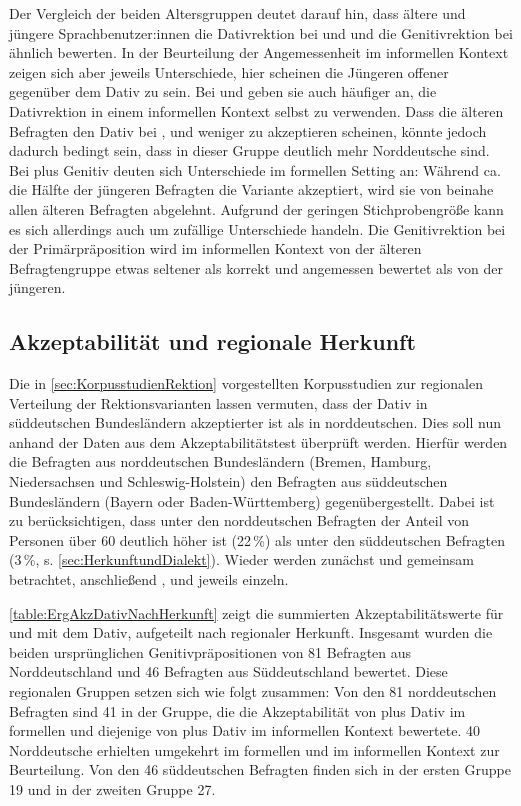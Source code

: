 Der Vergleich der beiden Altersgruppen deutet darauf hin, dass ältere und jüngere Sprachbenutzer:innen die Dativrektion bei \wegen{} und \waehrend{} und die Genitivrektion bei \dank{} ähnlich bewerten. 
In der Beurteilung der Angemessenheit im informellen Kontext zeigen sich aber jeweils Unterschiede, hier scheinen die Jüngeren offener gegenüber dem Dativ zu sein. 
Bei \wegen{} und \waehrend{} geben sie auch häufiger an, die Dativrektion in einem informellen Kontext selbst zu verwenden. 
Dass die älteren Befragten den Dativ bei \wegen{}, \waehrend{} und \dank{} weniger zu akzeptieren scheinen, könnte jedoch dadurch bedingt sein, dass in dieser Gruppe deutlich mehr Norddeutsche sind. 
Bei \gegenueber{} plus Genitiv deuten sich Unterschiede im formellen Setting an:
Während ca. die Hälfte der jüngeren Befragten die Variante akzeptiert, wird sie von beinahe allen älteren Befragten abgelehnt. 
Aufgrund der geringen Stichprobengröße kann es sich allerdings auch um zufällige Unterschiede handeln. 
Die Genitivrektion bei der Primärpräposition  wird im informellen Kontext von der älteren Befragtengruppe etwas seltener als korrekt und angemessen bewertet als von der jüngeren. 

\subsection{Akzeptabilität und regionale Herkunft}
\label{sec:ErgAkzNachRegion}
\begin{sloppypar}
Die in \autoref{sec:KorpusstudienRektion} vorgestellten Korpusstudien zur regionalen Verteilung der Rektionsvarianten lassen vermuten, dass der Dativ in süddeutschen Bundesländern akzeptierter ist als in norddeutschen. 
Dies soll nun anhand der Daten aus dem Akzeptabilitätstest überprüft werden. 
Hierfür werden die Befragten aus norddeutschen Bundesländern (Bremen, Hamburg, Niedersachsen und Schleswig\hyp Holstein) den Befragten aus süddeutschen Bundesländern (Bayern oder Baden\hyp Württemberg) gegenübergestellt. 
Dabei ist zu berücksichtigen, dass unter den norddeutschen Befragten der Anteil von Personen über 60 deutlich höher ist (22\,\%) als unter den süddeutschen Befragten (3\,\%, s. \autoref{sec:HerkunftundDialekt}). 
Wieder werden zunächst \wegen{} und \waehrend{} gemeinsam betrachtet, anschließend \dank{}, \gegenueber{} und  jeweils einzeln. 
\end{sloppypar}

\autoref{table:ErgAkzDativNachHerkunft} zeigt die summierten Akzeptabilitätswerte für \wegen{} und \waehrend{} mit dem Dativ, aufgeteilt nach regionaler Herkunft. 
Insgesamt wurden die beiden ursprünglichen Genitivpräpositionen von 81 Befragten aus Norddeutschland und 46 Befragten aus Süddeutschland bewertet. 
Diese regionalen Gruppen setzen sich wie folgt zusammen: 
Von den 81 norddeutschen Befragten sind 41 in der Gruppe, die die Akzeptabilität von \wegen{} plus Dativ im formellen und diejenige von \waehrend{} plus Dativ im informellen Kontext bewertete.
40 Norddeutsche erhielten umgekehrt \waehrend{} im formellen und \wegen{} im informellen Kontext zur Beurteilung. 
Von den 46 süddeutschen Befragten finden sich in der ersten Gruppe 19 und in der zweiten Gruppe 27. 

